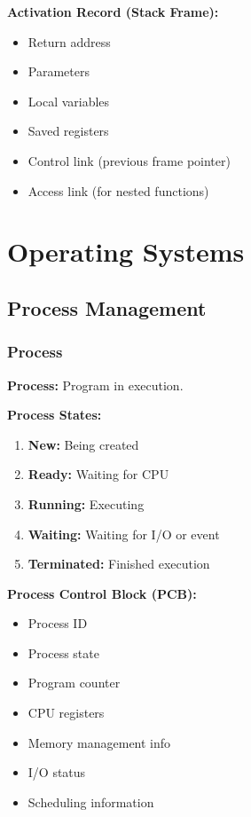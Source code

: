 \documentclass[11pt,a4paper]{article}
\begin{document}
\textbf{Activation Record (Stack Frame):}
\begin{itemize}
    \item Return address
    \item Parameters
    \item Local variables
    \item Saved registers
    \item Control link (previous frame pointer)
    \item Access link (for nested functions)
\end{itemize}

\section{Operating Systems}

\subsection{Process Management}

\subsubsection{Process}

\begin{defbox}
\textbf{Process:} Program in execution.
\end{defbox}

\textbf{Process States:}
\begin{enumerate}
    \item \textbf{New:} Being created
    \item \textbf{Ready:} Waiting for CPU
    \item \textbf{Running:} Executing
    \item \textbf{Waiting:} Waiting for I/O or event
    \item \textbf{Terminated:} Finished execution
\end{enumerate}

\textbf{Process Control Block (PCB):}
\begin{itemize}
    \item Process ID
    \item Process state
    \item Program counter
    \item CPU registers
    \item Memory management info
    \item I/O status
    \item Scheduling information
\end{itemize}
\end{document}
